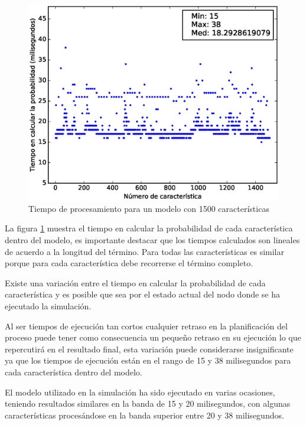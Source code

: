 \begin{figure}[h]
	\centering
	\linefigure
	\includegraphics[width=0.8\hsize,angle=0]{plot_probs_times.eps}
	\linefigure
	\caption{Tiempo de procesamiento para un modelo con 1500 características}\label{fig:plot:probs:times}
\end{figure}

La figura \ref{fig:plot:probs:times} muestra el tiempo
en calcular la probabilidad de cada característica dentro
del modelo, es importante destacar que los tiempos calculados
son lineales de acuerdo a la longitud del término.
Para todas las características es similar porque para cada
característica debe recorrerse el término completo.

Existe una variación entre el tiempo en calcular la
probabilidad de cada característica y es posible que sea
por el estado actual del nodo donde se ha ejecutado la simulación.

Al ser tiempos de ejecución tan cortos cualquier retraso en 
la planificación del proceso puede tener como consecuencia un
pequeño retraso en su ejecución lo que repercutirá en el resultado
final, esta variación puede considerarse insignificante ya que los
tiempos de ejecución están en el rango de 15 y 38 milisegundos
para cada característica dentro del modelo.

El modelo utilizado en la simulación ha sido ejecutado
en varias ocasiones, teniendo resultados similares en la banda
de 15 y 20 milisegundos, con algunas características procesándose
en la banda superior entre 20 y 38 milisegundos.

